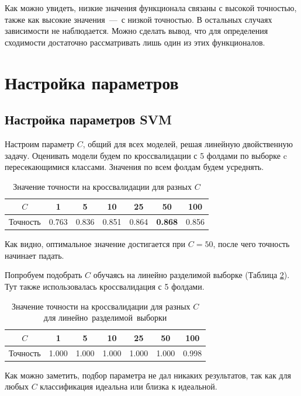 \documentclass[12pt,fleqn,unicode]{article}
\begin{document}
Как можно увидеть, низкие значения функционала связаны с высокой точностью, также как высокие значения~---~с низкой
точностью. В остальных случаях зависимости не наблюдается. Можно сделать вывод, что для определения сходимости
достаточно рассматривать лишь один из этих функционалов.

\pagebreak
\section{Настройка параметров}

\subsection{Настройка параметров SVM}

Настроим параметр $C$, общий для всех моделей, решая линейную двойственную задачу. Оценивать модели будем по
кроссвалидации с 5 фолдами по выборке c пересекающимися классами. Значения по всем фолдам будем усреднять.

\begin{table}[h!]
	\centering
	\begin{tabular}{|c|c|c|c|c|c|c|}
	\hline
$C$ & 1 & 5 & 10 & 25 & \textbf{50} & 100 \\ \hline
Точность & 0.763 & 0.836 & 0.851 & 0.864 & \textbf{0.868} & 0.856 \\ \hline
	\end{tabular}
	\caption{Значение точности на кроссвалидации для разных $C$}
	\label{tab5}
\end{table}

Как видно, оптимальное значение достигается при $C=50$, после чего точность начинает падать.

Попробуем подобрать $C$ обучаясь на линейно разделимой выборке (Таблица \ref{tab6}). Тут также
использовалась кроссвалидация с 5 фолдами.

\begin{table}[h!]
	\captionsetup{justification=centering}
	\centering
	\begin{tabular}{|c|c|c|c|c|c|c|}
	\hline
$C$ & 1 & 5 & 10 & 25 & 50 & 100 \\ \hline
Точность & 1.000 & 1.000 & 1.000 & 1.000 & 1.000 & 0.998 \\ \hline
	\end{tabular}
	\caption{Значение точности на кроссвалидации для разных $C$ для линейно~разделимой~выборки}
	\label{tab6}
\end{table}

Как можно заметить, подбор параметра не дал никаких результатов, так как для любых $C$ классификация
идеальна или близка к идеальной.
\end{document}
